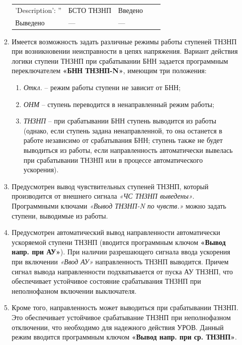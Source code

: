 \begin{enumerate}[label=\arabic{section}.\arabic{subsection}.\arabic{enumi}, labelsep=4pt, leftmargin=0pt, itemindent=57pt, itemsep=0pt, parsep=5pt]
\begin{enumerate}[label=\arabic{section}.\arabic{subsection}.\arabic{enumi}.\arabic*, labelsep=4pt, leftmargin=0em, itemindent=65pt, parsep=0pt]
\begin{longtable}{|>{\centering\arraybackslash}m{5.3cm}|>{\centering\arraybackslash}m{3.3cm}|>{\centering\arraybackslash}m{4.2cm}|>{\centering\arraybackslash}m{1.8cm}|>{\centering\arraybackslash}m{1cm}|}
\hline
\raggedright {'Description': ''} & \centering БСТО ТНЗНП & \centering Введено \\ Выведено & \centering --- & \centering \arraybackslash --- \\
\hline

\end{longtable}
\normalsize

\item
Имеется возможность задать различные режимы работы ступеней ТНЗНП при возникновении неисправности в цепях напряжения. Вариант действия логики ступени ТНЗНП при срабатывании БНН задается программным переключателем \textbf{«БНН ТНЗНП-N»}, имеющим три положения:

\begin{enumerate}[label=\arabic*)]
\item \textit{Откл.} -- режим работы ступени не зависит от БНН;
\item \textit{ОНМ} -- ступень переводится в ненаправленный режим работы;
\item \textit{ТНЗНП} --  при срабатывании БНН ступень выводится из работы (однако, если ступень задана ненаправленной, то она останется в работе независимо от срабатывания БНН; ступень также не будет выводиться из работы, если направленность автоматически вывелась при срабатывании ТНЗНП или в процессе автоматического ускорения).
\end{enumerate}

\item
Предусмотрен вывод чувствительных ступеней ТНЗНП, который производится от внешнего сигнала \textit{«ЧС ТНЗНП выведены»}. Программными ключами \textit{«Вывод ТНЗНП-N по чувств.»} можно задать ступени, выводимые из работы.

\item
Предусмотрен автоматический вывод направленности автоматически ускоряемой ступени ТНЗНП (вводится программным ключом \textbf{«Вывод напр. при АУ»}). При наличии разрешающего сигнала ввода ускорения при включении \textit{«Ввод АУ»} направленность ТНЗНП выводится. Причем сигнал вывода направленности подхватывается от пуска АУ ТНЗНП, что обеспечивает устойчивое состояние срабатывания ТНЗНП при неполнофазном включении выключателя. 

\item
Кроме того, направленность может выводиться при срабатывании ТНЗНП. Это обеспечивает устойчивое срабатывание ТНЗНП при неполнофазном отключении, что необходимо для надежного действия УРОВ. Данный режим вводится программным ключом \textbf{«Вывод напр. при ср. ТНЗНП»}.


\end{enumerate}
\end{enumerate}
